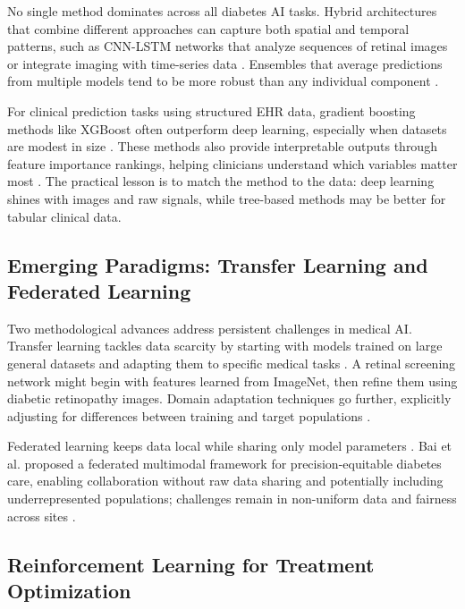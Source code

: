 No single method dominates across all diabetes AI tasks. Hybrid architectures that combine different approaches can capture both spatial and temporal patterns, such as CNN-LSTM networks that analyze sequences of retinal images or integrate imaging with time-series data \cite{zhu2021deep, alam2024machine}. Ensembles that average predictions from multiple models tend to be more robust than any individual component \cite{alam2024machine, alam2025machine}.

For clinical prediction tasks using structured EHR data, gradient boosting methods like XGBoost often outperform deep learning, especially when datasets are modest in size \cite{alam2024machine, oikonomou2023machine}. These methods also provide interpretable outputs through feature importance rankings, helping clinicians understand which variables matter most \cite{oikonomou2023machine}. The practical lesson is to match the method to the data: deep learning shines with images and raw signals, while tree-based methods may be better for tabular clinical data.

\subsection{Emerging Paradigms: Transfer Learning and Federated Learning}

Two methodological advances address persistent challenges in medical AI. Transfer learning tackles data scarcity by starting with models trained on large general datasets and adapting them to specific medical tasks \cite{contreras2018artificial, zhu2021deep, ran2024sourcefree}. A retinal screening network might begin with features learned from ImageNet, then refine them using diabetic retinopathy images. Domain adaptation techniques go further, explicitly adjusting for differences between training and target populations \cite{fahmy2025exploring, chen2024crossmodality}.

Federated learning keeps data local while sharing only model parameters \cite{fahmy2025exploring, bai2024federated}. Bai et al. \cite{bai2024federated} proposed a federated multimodal framework for precision-equitable diabetes care, enabling collaboration without raw data sharing and potentially including underrepresented populations; challenges remain in non-uniform data and fairness across sites \cite{fahmy2025exploring, raj2024federated}.

\subsection{Reinforcement Learning for Treatment Optimization}

